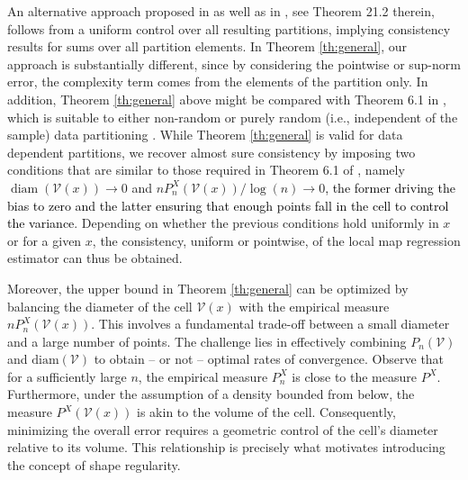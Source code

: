 \documentclass[paper=a4, fontsize=11pt]{scrartcl}
\newcommand{\diam}{\operatorname{diam}}
\newcommand{\rev}[1]{\textcolor{black}{#1}}
\begin{document}
An alternative approach proposed in \cite{lugosinobel,nobel} as well as in \cite{devroye96probabilistic}, see Theorem 21.2 therein, follows from a uniform control over all resulting partitions, implying consistency results for sums over all partition elements. In Theorem \ref{th:general}, our approach is substantially different, since by considering the pointwise or sup-norm error,  the complexity term comes from the elements of the partition only. In addition, Theorem \ref{th:general} above might be compared with Theorem 6.1 in \cite{devroye96probabilistic}, which is suitable to either non-random or purely random (i.e., independent of the sample) data partitioning \citep{JMLR:v9:biau08a}. While Theorem \ref{th:general} is valid for data dependent partitions, we recover almost sure consistency by imposing two conditions that are similar to those required in Theorem 6.1 of \cite{devroye96probabilistic}, namely $\diam  (\mathcal V(x) )  \to 0 $ and $ nP_n^X( \mathcal V(x) ) / \log(n )  \to 0$\rev{, the former driving the bias to zero and the latter ensuring that enough points fall in the cell to control the variance}. Depending on whether the previous conditions hold uniformly in $x$ or for a given $x$, the consistency, uniform or pointwise, of the local map regression estimator can thus be obtained.

Moreover, the upper bound in Theorem \ref{th:general} can be optimized by balancing the diameter of the cell $\mathcal{V}(x)$ with the empirical measure $n P_n^X(\mathcal{V}(x))$. This involves a fundamental trade-off between a small diameter and a large number of points. The challenge lies in effectively combining $P_n(\mathcal{V})$ and $\text{diam}(\mathcal{V})$ to obtain -- or not -- optimal rates of convergence. Observe that for a sufficiently large $n$, the empirical measure $P_n^X$ is close to the measure $P^X$. Furthermore, under the assumption of a density bounded from below, the measure $P^X(\mathcal{V}(x))$ is akin to the volume of the cell. Consequently, minimizing the overall error requires a geometric control of the cell's diameter relative to its volume. This relationship is precisely what motivates introducing the concept of shape regularity.
\end{document}
